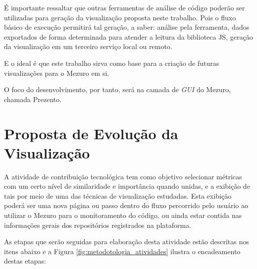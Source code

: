 É importante ressaltar que outras ferramentas de análise de código poderão ser
utilizadas para geração da visualização proposta neste trabalho. Pois o fluxo
básico de execução permitirá tal geração, a saber: análise pela ferramenta,
dados exportados de forma determinada para atender a leitura da biblioteca JS,
geração da visualização em um terceiro serviço local ou remoto.

E o ideal é que este trabalho sirva como base para a criação de futuras
visualizações para o Mezuro em si.

O foco do desenvolvimento, por tanto, será na camada de \textit{GUI} do Mezuro,
chamada Prezento.

\section{Proposta de Evolução da Visualização}

A atividade de contribuição tecnológica tem como objetivo selecionar métricas
com um certo nível  de similaridade e importância quando unidas, e a exibição de
tais por meio de uma das técnicas de visualização estudadas. Esta exibição
poderá ser uma nova página ou passo dentro do fluxo percorrido pelo usuário ao
utilizar o Mezuro para o monitoramento do código, ou ainda estar contida nas
informações gerais dos repositórios registrados na plataforma.

As etapas que serão seguidas para elaboração desta atividade estão descritas
nos itens abaixo e a Figura \ref{fig:metodotologia_atividades} ilustra o
encadeamento destas etapas:


